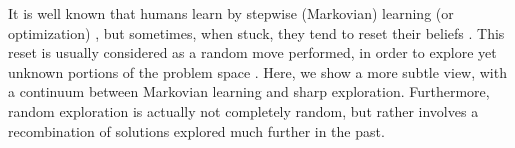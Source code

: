 It is well known that humans learn by stepwise (Markovian) learning (or optimization) \cite{}, but sometimes, when stuck, they tend to reset their beliefs \cite{}. This reset is usually considered as a random move performed, in order to explore yet unknown portions of the problem space \cite{}. Here, we show a more subtle view, with a continuum between Markovian learning and sharp exploration. Furthermore, random exploration is actually not completely random, but rather involves a recombination of solutions explored much further in the past. 
